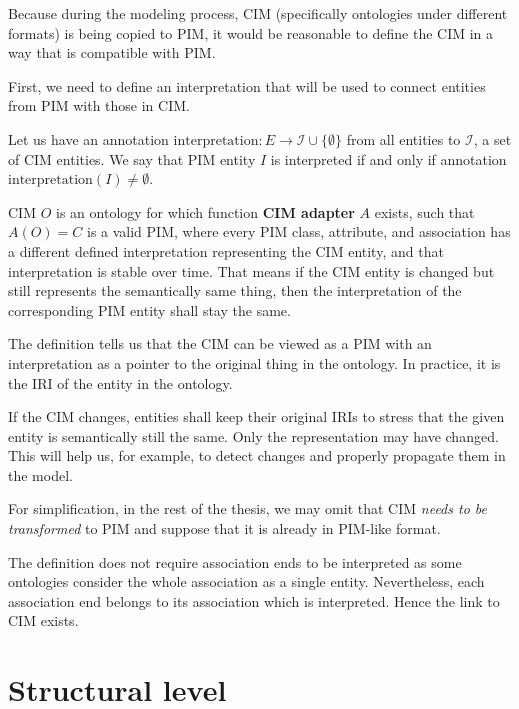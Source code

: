 Because during the modeling process, CIM (specifically ontologies under different formats) is being copied to PIM, it would be reasonable to define the CIM in a way that is compatible with PIM.

First, we need to define an interpretation that will be used to connect entities from PIM with those in CIM.

\begin{definition}[interpretation]
    Let us have an annotation $\textrm{interpretation}: E \rightarrow \mathcal{I} \cup \{\emptyset\}$ from all entities to $\mathcal{I}$, a set of CIM entities. We say that PIM entity $I$ is interpreted if and only if annotation $\textrm{interpretation}(I) \neq \emptyset$.
\end{definition}

\begin{definition}[CIM]
    CIM $O$ is an ontology for which function \textbf{CIM adapter} $A$ exists, such that $A(O) = C$ is a valid PIM, where every PIM class, attribute, and association has a different defined interpretation representing the CIM entity, and that interpretation is stable over time. That means if the CIM entity is changed but still represents the semantically same thing, then the interpretation of the corresponding PIM entity shall stay the same.
\end{definition}

The definition tells us that the CIM can be viewed as a PIM with an interpretation as a pointer to the original thing in the ontology. In practice, it is the IRI of the entity in the ontology.

If the CIM changes, entities shall keep their original IRIs to stress that the given entity is semantically still the same. Only the representation may have changed. This will help us, for example, to detect changes and properly propagate them in the model.

For simplification, in the rest of the thesis, we may omit that CIM \textit{needs to be transformed} to PIM and suppose that it is already in PIM-like format.

The definition does not require association ends to be interpreted as some ontologies consider the whole association as a single entity. Nevertheless, each association end belongs to its association which is interpreted. Hence the link to CIM exists.

\section{Structural level}

